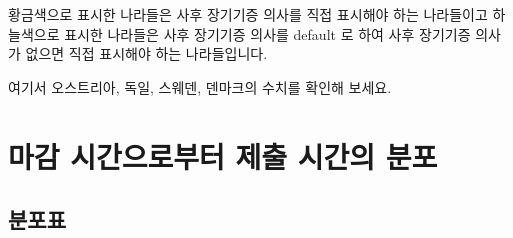 \documentclass[
]{book}
\begin{document}
황금색으로 표시한 나라들은 사후 장기기증 의사를 직접 표시해야 하는 나라들이고 하늘색으로 표시한 나라들은 사후 장기기증 의사를 default 로 하여 사후 장기기증 의사가 없으면 직접 표시해야 하는 나라들입니다.

여기서 오스트리아, 독일, 스웨덴, 덴마크의 수치를 확인해 보세요.

\section{마감 시간으로부터 제출 시간의 분포}\label{uxb9c8uxac10-uxc2dcuxac04uxc73cuxb85cuxbd80uxd130-uxc81cuxcd9c-uxc2dcuxac04uxc758-uxbd84uxd3ec-12}

\subsection{분포표}\label{uxbd84uxd3ecuxd45c-13}
\end{document}
